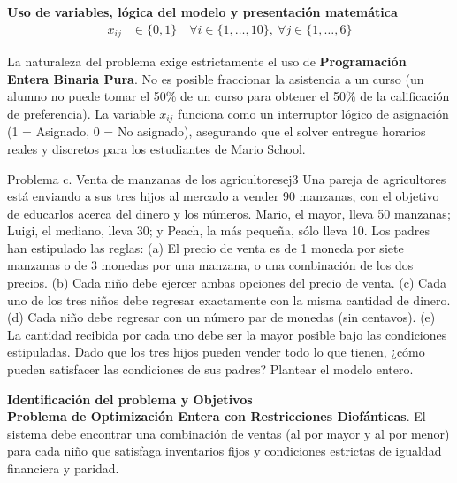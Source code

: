 \documentclass[10pt,a4paper]{article}
\begin{document}
\vspace{3mm}

\textbf{Uso de variables, lógica del modelo y presentación matemática}
\begin{align*}
    x_{ij} &\in \{0, 1\} \quad \forall i \in \{1, \dots, 10\}, \ \forall j \in \{1, \dots, 6\}
\end{align*}

\begin{nota}{}
La naturaleza del problema exige estrictamente el uso de \textbf{Programación Entera Binaria Pura}. No es posible fraccionar la asistencia a un curso (un alumno no puede tomar el 50\% de un curso para obtener el 50\% de la calificación de preferencia). La variable $x_{ij}$ funciona como un interruptor lógico de asignación (1 = Asignado, 0 = No asignado), asegurando que el solver entregue horarios reales y discretos para los estudiantes de Mario School.
\end{nota}

\newpage

\begin{ejercicio}{Problema c. Venta de manzanas de los agricultores}{ej3}
Una pareja de agricultores está enviando a sus tres hijos al mercado a vender 90 manzanas, con el objetivo de educarlos acerca del dinero y los números. Mario, el mayor, lleva 50 manzanas; Luigi, el mediano, lleva 30; y Peach, la más pequeña, sólo lleva 10. Los padres han estipulado las reglas: (a) El precio de venta es de 1 moneda por siete manzanas o de 3 monedas por una manzana, o una combinación de los dos precios. (b) Cada niño debe ejercer ambas opciones del precio de venta. (c) Cada uno de los tres niños debe regresar exactamente con la misma cantidad de dinero. (d) Cada niño debe regresar con un número par de monedas (sin centavos). (e) La cantidad recibida por cada uno debe ser la mayor posible bajo las condiciones estipuladas. Dado que los tres hijos pueden vender todo lo que tienen, ¿cómo pueden satisfacer las condiciones de sus padres? Plantear el modelo entero.
\end{ejercicio}

\vspace{3mm}
\textbf{Identificación del problema y Objetivos}\\
\textbf{Problema de Optimización Entera con Restricciones Diofánticas}. El sistema debe encontrar una combinación de ventas (al por mayor y al por menor) para cada niño que satisfaga inventarios fijos y condiciones estrictas de igualdad financiera y paridad.
\end{document}
